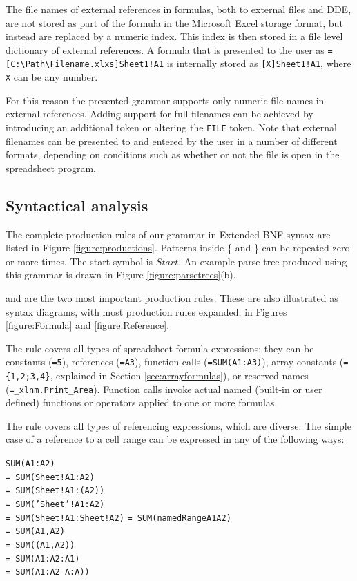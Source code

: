 \documentclass[conference]{IEEEtran}
\begin{document}
The file names of external references in formulas, both to external files and DDE, are not stored as part of the formula in the Microsoft Excel storage format, but instead are replaced by a numeric index.
This index is then stored in a file level dictionary of external references.
A formula that is presented to the user as \texttt{=[C:\textbackslash Path\textbackslash Filename.xlxs]Sheet1!A1} is internally stored as \texttt{[X]Sheet1!A1}, where \texttt{X} can be any number.

For this reason the presented grammar supports only numeric file names in external references.
Adding support for full filenames can be achieved by introducing an additional token or altering the \texttt{FILE} token. Note that external filenames can be presented to and entered by the user in a number of different formats, depending on conditions such as whether or not the file is open in the spreadsheet program.

\subsection{Syntactical analysis}
\label{subsection:productionRules}

The complete production rules of our grammar in Extended BNF syntax are listed in Figure \ref{figure:productions}.
Patterns inside \{ and \} can be repeated zero or more times.
The start symbol is $Start$. An example parse tree produced using this grammar is drawn in Figure \ref{figure:parsetrees}(b).

 and  are the two most important production rules.
These are also illustrated as syntax diagrams, with most production rules expanded, in Figures \ref{figure:Formula} and \ref{figure:Reference}.

The  rule covers all types of spreadsheet formula expressions: they can be constants (\texttt{=5}), references (\texttt{=A3}), function calls (\texttt{=SUM(A1:A3)}), array constants (\texttt{=\{1,2;3,4\}}, explained in Section \ref{sec:arrayformulas}), or reserved names (\texttt{=_xlnm.Print_Area}). Function calls invoke actual named (built-in or user defined) functions or operators applied to one or more formulas.

The  rule covers all types of referencing expressions, which are diverse. The simple case of a reference to a cell range can be expressed in any of the following ways:

\begin{multicols}{2}
	\texttt{SUM(A1:A2)} \\ 
	\texttt{= SUM(Sheet!A1:A2)} \\
	\texttt{= SUM(Sheet!A1:(A2))} \\
	\texttt{= SUM('Sheet'!A1:A2)} \\
			\columnbreak
	\texttt{= SUM(Sheet!A1:Sheet!A2)}
	\texttt{= SUM(namedRangeA1A2)} \\ 
	\texttt{= SUM(A1,A2)} \\ 
	\texttt{= SUM((A1,A2))} \\ 
	\texttt{= SUM(A1:A2:A1)} \\
	\texttt{= SUM(A1:A2 A:A))} 
\end{multicols}
\end{document}

